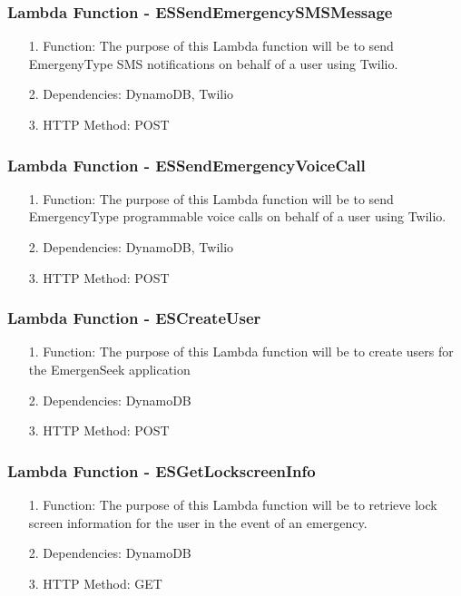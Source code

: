 \documentclass[10pt, a4paper]{article}
\begin{document}
\subsubsection{Lambda Function - ESSendEmergencySMSMessage}
\begin{enumerate}
	\item[1.] Function: The purpose of this Lambda function will be to send EmergenyType SMS notifications on behalf of a user using Twilio.
	\item[2.] Dependencies: DynamoDB, Twilio
	\item[3.] HTTP Method: POST
\end{enumerate}

\subsubsection{Lambda Function - ESSendEmergencyVoiceCall}
\begin{enumerate}
	\item[1.] Function: The purpose of this Lambda function will be to send EmergencyType programmable voice calls on behalf of a user using Twilio.
	\item[2.] Dependencies: DynamoDB, Twilio
	\item[3.] HTTP Method: POST
\end{enumerate}

\subsubsection{Lambda Function - ESCreateUser}
\begin{enumerate}
	\item[1.] Function: The purpose of this Lambda function will be to create users for the EmergenSeek application
	\item[2.] Dependencies: DynamoDB
	\item[3.] HTTP Method: POST
\end{enumerate}


\subsubsection{Lambda Function - ESGetLockscreenInfo}
\begin{enumerate}
	\item[1.] Function: The purpose of this Lambda function will be to retrieve lock screen information for the user in the event of an emergency. 
	\item[2.] Dependencies: DynamoDB
	\item[3.] HTTP Method: GET
\end{enumerate}
\end{document}

